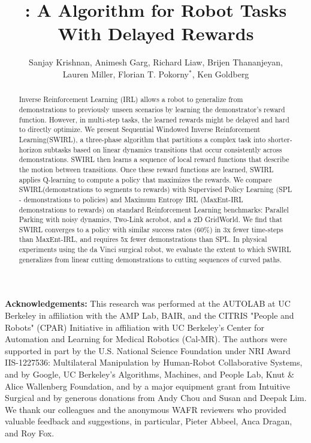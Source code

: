 \documentclass{llncs}
\title{\LARGE \bf \hirl: A \hirlfull Algorithm for Robot Tasks With Delayed Rewards}
\author{%
Sanjay Krishnan, 
Animesh Garg, 
Richard Liaw,
Brijen Thananjeyan,\\
Lauren Miller,
Florian T. Pokorny$^{*}$,
Ken Goldberg%
}
\institute{The AUTOLAB at UC Berkeley (automation.berkeley.edu)\\$^{*}$CAS/CVAP, KTH Royal Institute of Technology, Stockholm, Sweden}
\newcommand{\hirl}{SWIRL\xspace}
\newcommand{\hirlfull}{Sequential Windowed Inverse Reinforcement Learning\xspace}
\begin{document}
\maketitle

\begin{abstract}
Inverse Reinforcement Learning (IRL) allows a robot to generalize from demonstrations to previously unseen scenarios by learning the demonstrator's reward function.
However, in multi-step tasks, the learned rewards might be delayed and hard to directly optimize.
We present \hirlfull (\hirl), a three-phase algorithm that partitions a complex task into shorter-horizon subtasks based on linear dynamics transitions that occur consistently across demonstrations.
\hirl then learns a sequence of local reward functions that describe the motion between transitions. 
Once these reward functions are learned, \hirl applies Q-learning to compute a policy that maximizes the rewards. 
We compare \hirl (demonstrations to segments to rewards) with Supervised Policy Learning (SPL - demonstrations to policies) and Maximum Entropy IRL (MaxEnt-IRL demonstrations to rewards) on standard Reinforcement Learning benchmarks: Parallel Parking with noisy dynamics, Two-Link acrobot, and a 2D GridWorld.
We find that \hirl converges to a policy with similar success rates (60\%) in 3x fewer time-steps than MaxEnt-IRL, and requires 5x fewer demonstrations than SPL.
In physical experiments using the da Vinci surgical robot, we evaluate the extent to which \hirl generalizes from linear cutting demonstrations to cutting sequences of curved paths.
\end{abstract} 





%
%
%
%

% 



\vspace{0.5em}

{\footnotesize 
\noindent \textbf{Acknowledgements:}
This research was performed at the AUTOLAB at UC Berkeley in
affiliation with the AMP Lab, BAIR, and the CITRIS "People and Robots" (CPAR) Initiative in affiliation with UC Berkeley's Center for Automation and Learning for Medical Robotics (Cal-MR). The authors were supported in part by the U.S. National Science Foundation under NRI Award IIS-1227536: Multilateral Manipulation by Human-Robot Collaborative Systems, and by Google, UC Berkeley's Algorithms, Machines, and People Lab, Knut \& Alice Wallenberg Foundation, and by a major equipment grant from Intuitive Surgical and by generous donations from Andy Chou and Susan and Deepak Lim. We thank our colleagues and the anonymous WAFR reviewers who provided valuable feedback and suggestions, in particular, Pieter Abbeel, Anca Dragan, and Roy Fox.}






%
\end{document}
